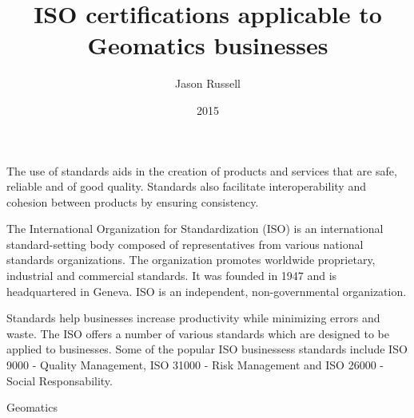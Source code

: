 \documentclass[11pt,a4paper]{article}
\title{ISO certifications applicable to Geomatics businesses}
\date{2015}
\author{Jason Russell}
\begin{document}
\maketitle

\newpage

The use of standards aids in the creation of products and services that are safe, reliable and of good quality.  Standards also facilitate interoperability and cohesion between products by ensuring consistency.

\vspace{5mm}

The International Organization for Standardization (ISO) is an international standard-setting body composed of representatives from various national standards organizations. The organization promotes worldwide proprietary, industrial and commercial standards. It was founded in 1947 and is headquartered in Geneva. ISO is an independent, non-governmental organization.

\vspace{5mm}

Standards help businesses increase productivity while minimizing errors and waste. The ISO offers a number of various standards which are designed to be applied to businesses. Some of the popular ISO businessess standards include ISO 9000 - Quality Management, ISO 31000 - Risk Management and ISO 26000 - Social Responsability.

\vspace{5mm}

Geomatics 


\newpage
\printbibliography
\end{document}
